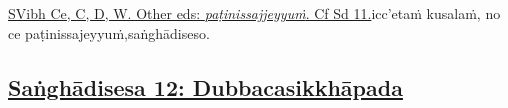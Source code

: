 {{{		\hypertarget{endnote79-appendix}{\hyperlink{endnote79-body}{SVibh Ce, C, D, W. Other eds: \textit{paṭinissajjeyyuṁ}. Cf Sd 11.}}}}}\makeatother \thinspace icc'etaṁ kusalaṁ, no ce paṭinissajeyyuṁ,\makeatletter\hyperlink{endnote80-appendix}\makeatother \thinspace saṅghādiseso.



\subsection*{\hyperref[comm12]{Saṅghādisesa 12: Dubbacasikkhāpada}}
\label{sd12}

